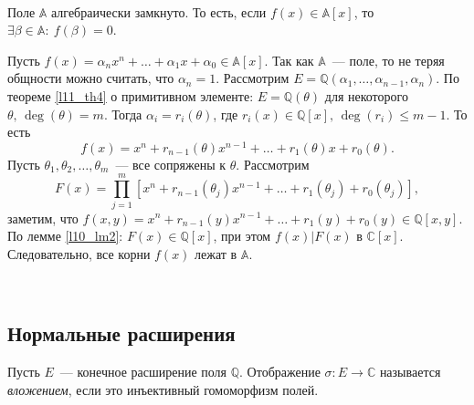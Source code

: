 \begin{theorem} \label{l12_th5}~\\
	Поле $\mathbb{A}$ алгебраически замкнуто. То есть, если $f(x) \in \mathbb{A}[x]$, то $\exists \beta \in \mathbb{A}: \ f(\beta) = 0$.
\end{theorem}
\begin{pf}
	Пусть $f(x) = \alpha_nx^n + \dots + \alpha_1x + \alpha_0 \in \mathbb{A}[x]$. Так как $\mathbb{A}$ — поле, то не теряя общности можно считать, что $\alpha_n = 1$. Рассмотрим $E = \mathbb{Q}\left( \alpha_1, \dots, \alpha_{n-1}, \alpha_n \right)$. По теореме \ref{l11_th4} о примитивном элементе: $E = \mathbb{Q}(\theta)$ для некоторого $\theta, \, \deg(\theta)=m$. Тогда $\alpha_i = r_i(\theta)$, где $r_i(x) \in \mathbb{Q}[x], \, \deg(r_i) \leq m-1$. То есть
	$$f(x) = x^n + r_{n-1}(\theta) x^{n-1} + \dots + r_1(\theta)x + r_0(\theta).$$
	Пусть $\theta_1, \theta_2, \dots, \theta_m$ — все сопряжены к $\theta$. Рассмотрим
	$$F(x) = \prod\limits_{j=1}^m \left[ x^n + r_{n-1}(\theta_j)x^{n-1} + \dots + r_1(\theta_j) + r_0(\theta_j) \right],$$
	заметим, что $f(x,y) = x^n + r_{n-1}(y)x^{n-1} + \dots + r_1(y) + r_0(y) \in \mathbb{Q}[x,y]$. По лемме \ref{l10_lm2}:
	$F(x) \in \mathbb{Q}[x]$, при этом $f(x) \vert F(x)$ в $\mathbb{C}[x]$.
	Следовательно, все корни $f(x)$ лежат в $\mathbb{A}$.
\end{pf}~\\

\subsection{Нормальные расширения}
\begin{definition}
	Пусть $E$ — конечное расширение поля $\mathbb{Q}$. Отображение $\sigma\colon E \to \mathbb{C}$ называется \textit{вложением}, если это инъективный гомоморфизм полей.
\end{definition}

